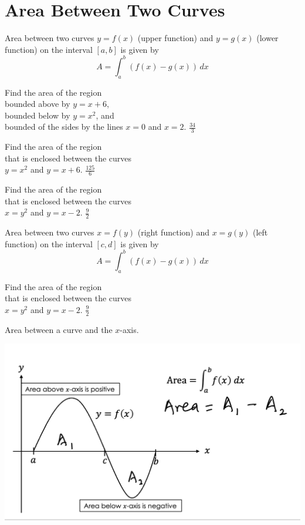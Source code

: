 
\section{Area Between Two Curves}

\begin{myframe}[arc=10pt,auto outer arc]
Area between two curves $y=f(x)$ (upper function) and $y=g(x)$ (lower function) on the interval $[a, b]$ is given by
\[
A = \int_a^b \left(f(x) - g(x)\right) \, dx
\]
\end{myframe}

\problemans%
{Find the area of the region\\
bounded above by $y = x + 6$,\\
bounded below by $y=x^2$, and \\
bounded of the sides by the lines $x=0$ and $x=2$.}
{$\frac{34}{3}$}%

\problemans%
{Find the area of the region\\
that is enclosed between the curves\\
$y=x^2$ and $y=x+6$.}%
{$\displaystyle \frac{125}{6}$}%

\newpage

\problemans%
{Find the area of the region\\
that is enclosed between the curves\\
$x=y^2$ and $y=x-2$.
}%
{$\displaystyle \frac{9}{2}$}%

\makenewpage
\begin{myframe}[arc=10pt,auto outer arc]
Area between two curves $x=f(y)$ (right function) and $x=g(y)$ (left function) on the interval $[c, d]$ is given by
\[
A = \int_a^b \left(f(x) - g(x)\right) \, dx
\]
\end{myframe}

\problemans%
{Find the area of the region\\
that is enclosed between the curves\\
$x=y^2$ and $y=x-2$.
}%
{$\frac{9}{2}$}%


\makenewpage

\begin{myframe}[arc=10pt,auto outer arc]
	\noindent Area between a curve and the $x$-axis.
	
	\includegraphics[width=0.7\linewidth]{chapter5/area}
\end{myframe}


